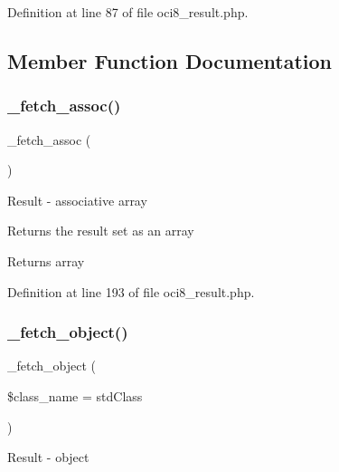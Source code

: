 Definition at line 87 of file oci8\+\_\+result.\+php.



\subsection{Member Function Documentation}
\mbox{\label{class_c_i___d_b__oci8__result_a43a9a92817f1334a1c10752ec44275a0}} 
\subsubsection{\texorpdfstring{\_fetch\_assoc()}{\_fetch\_assoc()}}
{\footnotesize\ttfamily \+\_\+fetch\+\_\+assoc (\begin{DoxyParamCaption}{ }\end{DoxyParamCaption})\hspace{0.3cm}{\ttfamily [protected]}}

Result -\/ associative array

Returns the result set as an array

\begin{DoxyReturn}{Returns}
array 
\end{DoxyReturn}


Definition at line 193 of file oci8\+\_\+result.\+php.

\mbox{\label{class_c_i___d_b__oci8__result_a60806be6a9c2488820813c2a7f4fef71}} 
\subsubsection{\texorpdfstring{\_fetch\_object()}{\_fetch\_object()}}
{\footnotesize\ttfamily \+\_\+fetch\+\_\+object (\begin{DoxyParamCaption}\item[{}]{\$class\+\_\+name = {\ttfamily \textquotesingle{}stdClass\textquotesingle{}} }\end{DoxyParamCaption})\hspace{0.3cm}{\ttfamily [protected]}}

Result -\/ object

